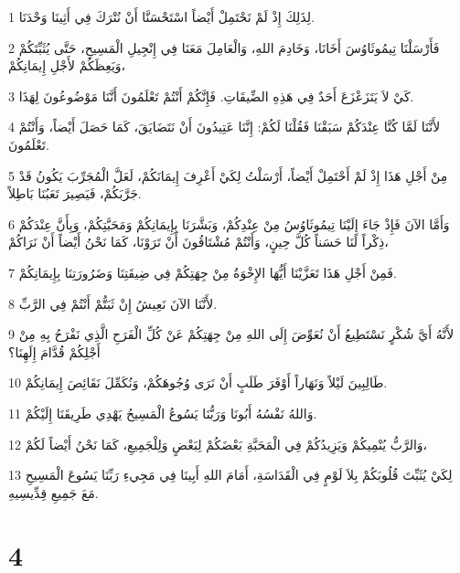 \par 1 لِذَلِكَ إِذْ لَمْ نَحْتَمِلْ أَيْضاً اسْتَحْسَنَّا أَنْ نُتْرَكَ فِي أَثِينَا وَحْدَنَا.
\par 2 فَأَرْسَلْنَا تِيمُوثَاوُسَ أَخَانَا، وَخَادِمَ اللهِ، وَالْعَامِلَ مَعَنَا فِي إِنْجِيلِ الْمَسِيحِ، حَتَّى يُثَبِّتَكُمْ وَيَعِظَكُمْ لأَجْلِ إِيمَانِكُمْ،
\par 3 كَيْ لاَ يَتَزَعْزَعَ أَحَدٌ فِي هَذِهِ الضِّيقَاتِ. فَإِنَّكُمْ أَنْتُمْ تَعْلَمُونَ أَنَّنَا مَوْضُوعُونَ لِهَذَا.
\par 4 لأَنَّنَا لَمَّا كُنَّا عِنْدَكُمْ سَبَقْنَا فَقُلْنَا لَكُمْ: إِنَّنَا عَتِيدُونَ أَنْ نَتَضَايَقَ، كَمَا حَصَلَ أَيْضاً، وَأَنْتُمْ تَعْلَمُونَ.
\par 5 مِنْ أَجْلِ هَذَا إِذْ لَمْ أَحْتَمِلْ أَيْضاً، أَرْسَلْتُ لِكَيْ أَعْرِفَ إِيمَانَكُمْ، لَعَلَّ الْمُجَرِّبَ يَكُونُ قَدْ جَرَّبَكُمْ، فَيَصِيرَ تَعَبُنَا بَاطِلاً.
\par 6 وَأَمَّا الآنَ فَإِذْ جَاءَ إِلَيْنَا تِيمُوثَاوُسُ مِنْ عِنْدِكُمْ، وَبَشَّرَنَا بِإِيمَانِكُمْ وَمَحَبَّتِكُمْ، وَبِأَنَّ عِنْدَكُمْ ذِكْراً لَنَا حَسَناً كُلَّ حِينٍ، وَأَنْتُمْ مُشْتَاقُونَ أَنْ تَرَوْنَا، كَمَا نَحْنُ أَيْضاً أَنْ نَرَاكُمْ،
\par 7 فَمِنْ أَجْلِ هَذَا تَعَزَّيْنَا أَيُّهَا الإِخْوَةُ مِنْ جِهَتِكُمْ فِي ضِيقَتِنَا وَضَرُورَتِنَا بِإِيمَانِكُمْ.
\par 8 لأَنَّنَا الآنَ نَعِيشُ إِنْ ثَبَتُّمْ أَنْتُمْ فِي الرَّبِّ.
\par 9 لأَنَّهُ أَيَّ شُكْرٍ نَسْتَطِيعُ أَنْ نُعَوِّضَ إِلَى اللهِ مِنْ جِهَتِكُمْ عَنْ كُلِّ الْفَرَحِ الَّذِي نَفْرَحُ بِهِ مِنْ أَجْلِكُمْ قُدَّامَ إِلَهِنَا؟
\par 10 طَالِبِينَ لَيْلاً وَنَهَاراً أَوْفَرَ طَلَبٍ أَنْ نَرَى وُجُوهَكُمْ، وَنُكَمِّلَ نَقَائِصَ إِيمَانِكُمْ.
\par 11 وَاللهُ نَفْسُهُ أَبُونَا وَرَبُّنَا يَسُوعُ الْمَسِيحُ يَهْدِي طَرِيقَنَا إِلَيْكُمْ.
\par 12 وَالرَّبُّ يُنْمِيكُمْ وَيَزِيدُكُمْ فِي الْمَحَبَّةِ بَعْضَكُمْ لِبَعْضٍ وَلِلْجَمِيعِ، كَمَا نَحْنُ أَيْضاً لَكُمْ،
\par 13 لِكَيْ يُثَبِّتَ قُلُوبَكُمْ بِلاَ لَوْمٍ فِي الْقَدَاسَةِ، أَمَامَ اللهِ أَبِينَا فِي مَجِيءِ رَبِّنَا يَسُوعَ الْمَسِيحِ مَعَ جَمِيعِ قِدِّيسِيهِ.

\chapter{4}

